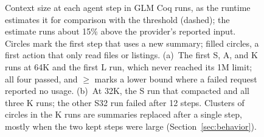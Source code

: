 \begin{figure}[t]
\caption{Context size at each agent step in GLM Coq runs, as the runtime estimates it for
comparison with the threshold (dashed); the estimate runs about 15\% above the provider's reported input.
Circles mark the first step that uses a new summary; filled circles, a first action that only read files
or listings. (a)~The first S, A, and K runs at 64K and the first L run, which never reached its 1M limit;
all four passed, and $\ge$ marks a lower bound where a failed request reported no usage. (b)~At 32K, the
S run that compacted and all three K runs; the other S32 run failed after 12 steps. Clusters of circles in
the K runs are summaries replaced after a single step, mostly when the two kept steps were large
(Section~\ref{sec:behavior}).}
\label{fig:trajectories}
\end{figure}
